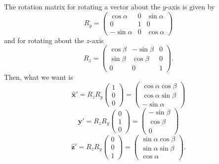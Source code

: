 The rotation matrix for rotating a vector about the $y$-axis is given by
\begin{equation}
  R_y =  
  \begin{pmatrix} 
    \cos\alpha & 0 & \sin\alpha \\ 
    0 & 1 & 0 \\
    -\sin\alpha & 0 & \cos\alpha 
  \end{pmatrix}
\end{equation}
and for rotating about the $z$-axis
\begin{equation}
  R_z = 
  \begin{pmatrix} 
    \cos\beta & -\sin\beta & 0 \\ 
    \sin\beta & \cos\beta & 0 \\
    0 & 0 & 1 
  \end{pmatrix}.
\end{equation}
Then, what we want is
\begin{equation}
  \mathbf{\hat{x}}' = 
  R_zR_y
  \begin{pmatrix}
    1 \\
    0 \\
    0
  \end{pmatrix}
  = 
  \begin{pmatrix}
    \cos\alpha\cos\beta \\
    \cos\alpha\sin\beta \\
    -\sin\alpha
  \end{pmatrix}
\end{equation}
\begin{equation}
  \mathbf{\hat{y}}' = 
  R_zR_y
  \begin{pmatrix}
    0 \\
    1 \\
    0
  \end{pmatrix}
  =
  \begin{pmatrix}
    -\sin\beta \\
    \cos\beta \\
    0
  \end{pmatrix}
\end{equation}
\begin{equation}
  \mathbf{\hat{z}}' = 
  R_zR_y
  \begin{pmatrix}
    0 \\
    0 \\
    1
  \end{pmatrix}
  =
  \begin{pmatrix}
    \sin\alpha\cos\beta \\
    \sin\alpha\sin\beta \\
    \cos\alpha
  \end{pmatrix}.
\end{equation}

